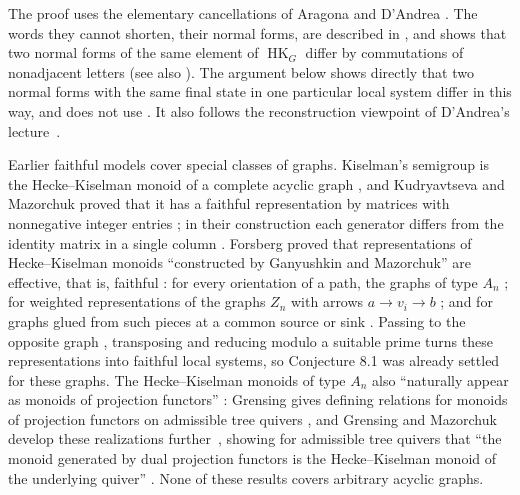\documentclass[11pt]{article}
\newcommand{\HK}{\operatorname{HK}}
\begin{document}
The proof uses the elementary cancellations of Aragona and D'Andrea
\cite[Lemma 2.1]{AD}. The words they cannot shorten, their normal forms, are
described in \cite[Remark 2.5]{AD}, and \cite[Theorem 3.1]{AD} shows that two
normal forms of the same element of $\HK_G$ differ by commutations of
nonadjacent letters (see also \cite[Corollary 3.2]{AD}). The argument below shows directly that two normal forms
with the same final state in one particular local system differ in this way,
and does not use \cite[Theorem 3.1]{AD}. It also follows the reconstruction
viewpoint of D'Andrea's lecture~\cite[slides 16, 19]{talk}.

Earlier faithful models cover special classes of graphs. Kiselman's
semigroup is the Hecke--Kiselman monoid of a complete acyclic graph
\cite[Example 12]{GM}, and Kudryavtseva and Mazorchuk proved that it has a
faithful representation by matrices with nonnegative integer entries
\cite[Theorem 34]{KM}; in their construction each generator differs from
the identity matrix in a single column \cite[Section 11.1]{KM}. Forsberg
proved that representations of Hecke--Kiselman monoids ``constructed by
Ganyushkin and Mazorchuk'' are effective, that is, faithful
\cite[abstract]{Forsberg}: for every orientation of a path, the graphs of
type $A_n$ \cite[Corollary 4.6]{Forsberg}; for weighted representations of
the graphs $Z_n$ with arrows $a\to v_i\to b$ \cite[Theorem 5.1]{Forsberg};
and for graphs glued from such pieces at a common source or sink
\cite[Theorem 4.5]{Forsberg}. Passing to the opposite graph
\cite[Proposition 13]{GM}, transposing and reducing modulo a suitable prime
turns these representations into faithful local systems, so Conjecture 8.1
was already settled for these graphs. The Hecke--Kiselman monoids of type
$A_n$ also ``naturally appear as monoids of projection functors''
\cite[Section 1]{Forsberg}: Grensing gives defining relations for monoids of
projection functors on admissible tree quivers \cite[Theorem 3.9]{Gr}, and
Grensing and Mazorchuk develop these realizations further~\cite{GrM1}, showing
for admissible tree quivers that ``the monoid generated by dual projection
functors is the Hecke--Kiselman monoid of the underlying quiver''
\cite[abstract]{GrM2}. None of these results covers arbitrary acyclic graphs.
\end{document}
